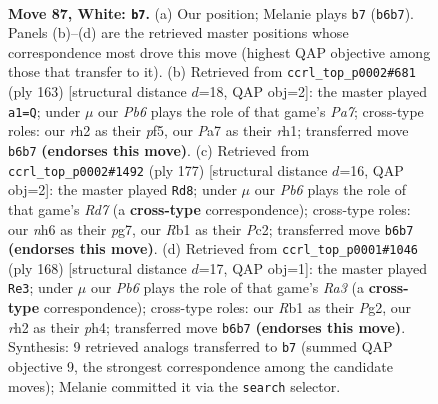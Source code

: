\documentclass[11pt]{article}
\begin{document}
\clearpage

\begin{figure}[p]\centering
\begin{subfigure}{0.46\textwidth}\centering
\resizebox{\linewidth}{!}{%
\newchessgame
\chessboard[
  setfen={7k/P7/1P5n/8/8/8/7r/KR6 w - - 9 87},
  showmover=false,
  pgfstyle=straightmove, color=movearrow, markmove={b6-b7}
]}
\caption{}
\end{subfigure}\hfill
\begin{subfigure}{0.46\textwidth}\centering
\resizebox{\linewidth}{!}{%
\newchessgame
\chessboard[
  setfen={8/8/8/5P2/5K2/rk6/p7/7R b - - 16 82},
  showmover=false,
  pgfstyle=straightmove, color=movearrow, markmove={a2-a1}
]}
\caption{}
\end{subfigure}
\\[4pt]
\begin{subfigure}{0.46\textwidth}\centering
\resizebox{\linewidth}{!}{%
\newchessgame
\chessboard[
  setfen={8/1R4P1/8/8/8/5K2/2pr4/2k5 b - - 2 89},
  showmover=false,
  pgfstyle=straightmove, color=movearrow, markmove={d2-d8}
]}
\caption{}
\end{subfigure}\hfill
\begin{subfigure}{0.46\textwidth}\centering
\resizebox{\linewidth}{!}{%
\newchessgame
\chessboard[
  setfen={8/4k3/8/4r3/7p/R4K2/6P1/8 w - - 4 85},
  showmover=false,
  pgfstyle=straightmove, color=movearrow, markmove={a3-e3}
]}
\caption{}
\end{subfigure}
\caption{\textbf{Move 87, White: \texttt{b7}.} (a) Our position; Melanie plays \texttt{b7} (\texttt{b6b7}). Panels (b)--(d) are the retrieved master positions whose correspondence most drove this move (highest QAP objective among those that transfer to it). (b) Retrieved from \texttt{ccrl\_top\_p0002\#681} (ply 163) [structural distance $d$=18, QAP obj=2]: the master played \texttt{a1=Q}; under $\mu$ our \emph{Pb6} plays the role of that game's \emph{Pa7}; cross-type roles: our \emph{r}h2 as their \emph{p}f5, our \emph{P}a7 as their \emph{r}h1; transferred move \texttt{b6b7} \textbf{(endorses this move)}. (c) Retrieved from \texttt{ccrl\_top\_p0002\#1492} (ply 177) [structural distance $d$=16, QAP obj=2]: the master played \texttt{Rd8}; under $\mu$ our \emph{Pb6} plays the role of that game's \emph{Rd7} (a \textbf{cross-type} correspondence); cross-type roles: our \emph{n}h6 as their \emph{p}g7, our \emph{R}b1 as their \emph{P}c2; transferred move \texttt{b6b7} \textbf{(endorses this move)}. (d) Retrieved from \texttt{ccrl\_top\_p0001\#1046} (ply 168) [structural distance $d$=17, QAP obj=1]: the master played \texttt{Re3}; under $\mu$ our \emph{Pb6} plays the role of that game's \emph{Ra3} (a \textbf{cross-type} correspondence); cross-type roles: our \emph{R}b1 as their \emph{P}g2, our \emph{r}h2 as their \emph{p}h4; transferred move \texttt{b6b7} \textbf{(endorses this move)}. Synthesis: 9 retrieved analogs transferred to \texttt{b7} (summed QAP objective 9, the strongest correspondence among the candidate moves); Melanie committed it via the \texttt{search} selector.}
\label{fig:thought-m172}
\end{figure}
\end{document}
